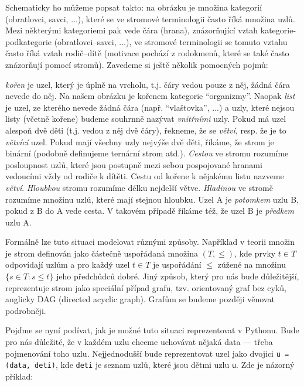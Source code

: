 Schematicky ho můžeme popsat takto: na obrázku je množina kategorií (obratlovci, savci, $\ldots$), které se ve stromové terminologii často říká množina
uzlů. Mezi některými kategoriemi pak vede čára (hrana), znázorňující vztah kategorie-podkategorie (obratlovci--savci, $\ldots$), ve stromové terminologii se tomuto vztahu
často říká vztah rodič--dítě (motivace pochází z rodokmenů, které se také často znázorňují pomocí stromů). Zavedeme si ještě několik pomocných pojmů:

\begin{definition}
\emph{kořen} je uzel, který je úplně na vrcholu, t.j. čáry vedou pouze z něj, žádná čára nevede do něj. Na našem obrázku je kořenem kategorie ``organizmy''.
Naopak \emph{list} je uzel, ze kterého nevede žádná čára (např. ``vlaštovka'', ...) a uzly, které nejsou listy (včetně kořene) budeme souhrnně nazývat
\emph{vnitřními} uzly. Pokud má uzel alespoň dvě děti (t.j. vedou z něj dvě čáry), řekneme, že se \emph{větví}, resp. že je to \emph{větvící} uzel.
Pokud mají všechny uzly nejvýše dvě děti, říkáme, že strom je binární (podobně definujeme ternární strom atd.). \emph{Cestou} ve stromu rozumíme posloupnost uzlů,
které jsou postupně mezi sebou pospojované hranami vedoucími vždy od rodiče k dítěti. Cestu od kořene k nějakému
listu nazveme \emph{větví}. \emph{Hloubkou} stromu rozumíme délku nejdelší větve. \emph{Hladinou} ve stromě rozumíme množinu uzlů, které mají stejnou hloubku.
Uzel A je \emph{potomkem} uzlu B, pokud z B do A vede cesta. V takovém případě říkáme též, že uzel B je \emph{předkem} uzlu A.
\end{definition}

\begin{note}\footnotesize
Formálně lze tuto situaci modelovat různými způsoby. Například v teorii množin je strom definován jako částečně uspořádaná množina $(T,\leq)$,
kde prvky $t\in T$ odpovídají uzlům a pro každý uzel $t\in T$ je uspořádání $\leq$ zúžené na množinu $\{s\in T:s\leq t\}$ jeho předchůdců dobré.
Jiný způsob, který pro nás bude důležitější, reprezentuje strom jako speciální případ grafu, tzv. orientovaný graf bez cyků, anglicky DAG (directed acyclic graph).
Grafům se budeme později věnovat podrobněji.
\end{note}

Pojďme se nyní podívat, jak je možné tuto situaci reprezentovat v Pythonu. Bude pro nás důležité, že v každém uzlu
chceme uchovávat nějaká data --- třeba pojmenování toho uzlu. Nejjednodušší bude reprezentovat uzel jako dvojici  {\tt u = (data, deti)},
kde {\tt deti} je seznam uzlů, které jsou dětmi uzlu {\tt u}. Zde je názorný příklad:

